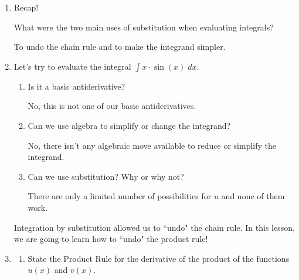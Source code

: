\documentclass[main]{subfiles}
\begin{document}
\begin{enumerate}
\item Recap! 

\begin{problem}[\vfill]
    What were the two main uses of substitution when evaluating integrals?
\end{problem}

\begin{solution}
    To undo the chain rule and to make the integrand simpler.
\end{solution}

\item Let's try to evaluate the integral $\displaystyle \int x \cdot \sin(x) \;dx$.
\begin{enumerate}
    \item 
    \begin{problem}[\vfill]
    Is it a basic antiderivative? 
\end{problem}

    \begin{solution}
        No, this is not one of our basic antiderivatives.
    \end{solution}

    \item 
    \begin{problem}[\vfill]
        Can we use algebra to simplify or change the integrand? 
    \end{problem}

    \begin{solution}
        No, there isn't any algebraic move available to reduce or simplify the integrand.
    \end{solution}

    \item 
    \begin{problem}[\vfill]
        Can we use substitution? Why or why not?
    \end{problem}

    \begin{solution}
        There are only a limited number of possibilities for $u$ and none of them work.
    \end{solution}
\end{enumerate}

Integration by substitution allowed us to ``undo" the chain rule. In this lesson, we are going to learn how to ``undo" the product rule!

\pspace{\newpage}

\item
\begin{enumerate}
    \item
    \begin{problem}[\vfill]
        State the Product Rule for the derivative of
        the product of the functions $u(x)$ and $v(x)$.
    \end{problem}


\end{enumerate}
\end{enumerate}
\end{document}
